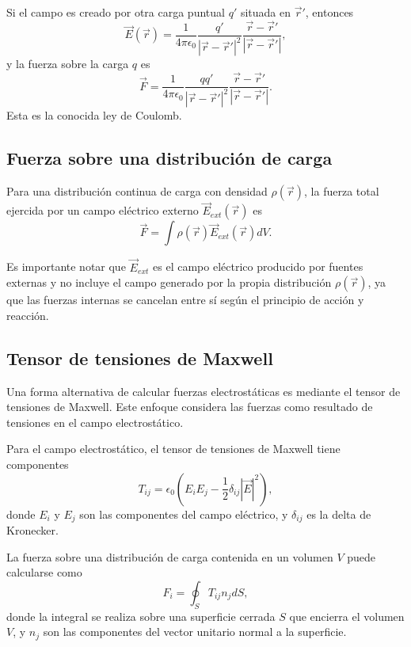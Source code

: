 \documentclass[12pt,a4paper]{book}
\begin{document}
Si el campo es creado por otra carga puntual $q'$ situada en $\vec{r}'$, entonces
\begin{equation}
\vec{E}(\vec{r}) = \frac{1}{4\pi\epsilon_0} \frac{q'}{|\vec{r} - \vec{r}'|^2} \frac{\vec{r} - \vec{r}'}{|\vec{r} - \vec{r}'|},
\end{equation}
y la fuerza sobre la carga $q$ es
\begin{equation}
\vec{F} = \frac{1}{4\pi\epsilon_0} \frac{qq'}{|\vec{r} - \vec{r}'|^2} \frac{\vec{r} - \vec{r}'}{|\vec{r} - \vec{r}'|}.
\end{equation}
Esta es la conocida ley de Coulomb.

\subsection{Fuerza sobre una distribución de carga}

Para una distribución continua de carga con densidad $\rho(\vec{r})$, la fuerza total ejercida por un campo eléctrico externo $\vec{E}_{ext}(\vec{r})$ es
\begin{equation}
\vec{F} = \int \rho(\vec{r}) \vec{E}_{ext}(\vec{r}) dV.
\end{equation}

Es importante notar que $\vec{E}_{ext}$ es el campo eléctrico producido por fuentes externas y no incluye el campo generado por la propia distribución $\rho(\vec{r})$, ya que las fuerzas internas se cancelan entre sí según el principio de acción y reacción.

\subsection{Tensor de tensiones de Maxwell}

Una forma alternativa de calcular fuerzas electrostáticas es mediante el tensor de tensiones de Maxwell. Este enfoque considera las fuerzas como resultado de tensiones en el campo electrostático.

Para el campo electrostático, el tensor de tensiones de Maxwell tiene componentes
\begin{equation}
T_{ij} = \epsilon_0 \left( E_i E_j - \frac{1}{2} \delta_{ij} |\vec{E}|^2 \right),
\end{equation}
donde $E_i$ y $E_j$ son las componentes del campo eléctrico, y $\delta_{ij}$ es la delta de Kronecker.

La fuerza sobre una distribución de carga contenida en un volumen $V$ puede calcularse como
\begin{equation}
F_i = \oint_S T_{ij} n_j dS,
\end{equation}
donde la integral se realiza sobre una superficie cerrada $S$ que encierra el volumen $V$, y $n_j$ son las componentes del vector unitario normal a la superficie.
\end{document}
